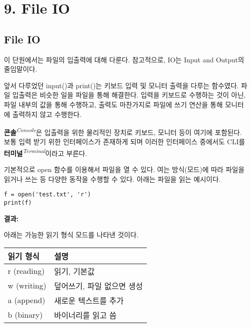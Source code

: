 \section[{9. File IO - {\it 파일 입출력}}]{9. File IO}

\subsection{File IO}

이 단원에서는 파일의 입출력에 대해 다룬다. 참고적으로, IO는 Input and Output의 줄임말이다.

앞서 다루었던 input()과 print()는 키보드 입력 및 모니터 출력을 다루는 함수였다. 파일 입출력은 비슷한 일을 파일을 통해 해결한다. 입력을 키보드로 수행하는 것이 아닌, 파일 내부의 값을 통해 수행하고, 출력도 마찬가지로 파일에 쓰기 연산을 통해 모니터에 출력하지 않고 수행한다.

\textbf{콘솔}\textit{\textsuperscript{Console}}은 입출력을 위한 물리적인 장치로 키보드, 모니터 등이 여기에 포함된다. 보통 입력 받기 위한 인터페이스가 존재하게 되며 이러한 인터페이스 중에서도 CLI를 \textbf{터미널}\textit{\textsuperscript{Terminal}}이라고 부른다.

기본적으로 open 함수를 이용해서 파일을 열 수 있다. 여는 방식(모드)에 따라 파일을 읽거나 쓰는 등 다양한 동작을 수행할 수 있다. 아래는 파일을 읽는 예시이다.

\begin{minipage}{\textwidth}
\begin{tcolorbox}[colframe=black, colback=white]
\begin{verbatim}
f = open('test.txt', 'r')
print(f)
\end{verbatim}
\end{tcolorbox}
\textbf{결과: }
\end{minipage}

아래는 가능한 읽기 형식 모드를 나타낸 것이다.

\begin{longtable}[]{@{}p{4cm} p{10cm}@{}}
    \toprule
    읽기 형식 & 설명\\
    \midrule
    \endhead
    r (reading) & 읽기, 기본값\\
    w (writing) & 덮어쓰기, 파일 없으면 생성\\
    a (append) & 새로운 텍스트를 추가\\
    b (binary) & 바이너리를 읽고 씀\\
    \bottomrule
\end{longtable}

